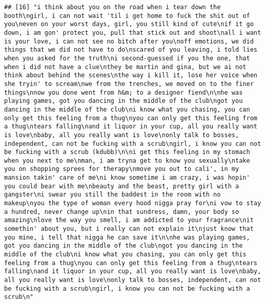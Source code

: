 \documentclass[]{article}
\begin{document}
\begin{verbatim}
## [16] "i think about you on the road when i tear down the booth\ngirl, i can not wait 'til i get home to fuck the shit out of you\neven on your worst days, girl, you still kind of cute\nif it go down, i am gon' protect you, pull that stick out and shoot\nall i want is your love, i can not see no bitch after you\noff emotions, we did things that we did not have to do\nscared of you leaving, i told lies when you asked for the truth\ni second-guessed if you the one, that when i did not have a clue\nthey be martin and gina, but we ai not think about behind the scenes\nthe way i kill it, lose her voice when she tryin' to scream\nwe from the trenches, we moved on to the finer things\nnow you done went from h&m; to a designer fiend\n\nhe was playing games, got you dancing in the middle of the club\ngot you dancing in the middle of the club\ni know what you chasing, you can only get this feeling from a thug\nyou can only get this feeling from a thug\ntears falling\nand it liquor in your cup, all you really want is love\nbaby, all you really want is love\nonly talk to bosses, independent, can not be fucking with a scrub\ngirl, i know you can not be fucking with a scrub (kdubb)\n\ni get this feeling in my stomach when you next to me\nman, i am tryna get to know you sexually\ntake you on shopping sprees for therapy\nmove you out to cali', in my mansion takin' care of me\ni know sometime i am crazy, i was hopin' you could bear with me\nbeauty and the beast, pretty girl with a gangster\ni swear you still the baddest in the room with no makeup\nyou the type of woman every hood nigga pray for\ni vow to stay a hundred, never change up\nin that sundress, damn, your body so amazing\nlove the way you smell, i am addicted to your fragrance\nit somethin' about you, but i really can not explain it\njust know that you mine, i tell that nigga he can save it\n\nhe was playing games, got you dancing in the middle of the club\ngot you dancing in the middle of the club\ni know what you chasing, you can only get this feeling from a thug\nyou can only get this feeling from a thug\ntears falling\nand it liquor in your cup, all you really want is love\nbaby, all you really want is love\nonly talk to bosses, independent, can not be fucking with a scrub\ngirl, i know you can not be fucking with a scrub\n"                                                                                                                                                                                                                                                                                                                                                                                                                                                                                                                                                                                                                                                                                                                                                                                                                                                                                                                                                                                                                                             
\end{verbatim}
\end{document}
